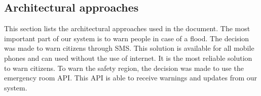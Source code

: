 

\subsection{Architectural approaches}
This section lists the architectural approaches used in the document.
The most important part of our system is to warn people in case of a flood. The decision was made to warn citizens through SMS. This solution is available for all mobile phones and can used without the use of internet. It is the most reliable solution to warn citizens. To warn the safety region, the decision was made to use the emergency room API. This API is able to receive warnings and updates from our system. 

